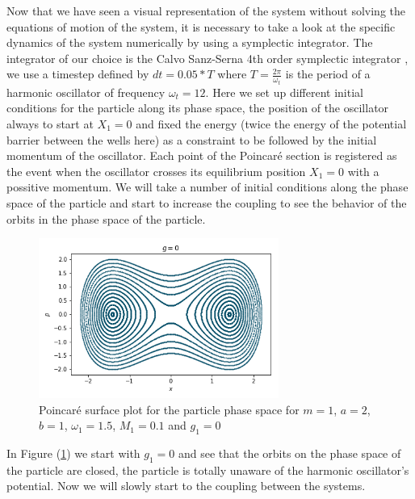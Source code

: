 Now that we have seen a visual representation of the system without solving the equations of motion of the system, it is necessary to take a look at the specific dynamics of the system numerically by using a symplectic integrator. The integrator of our choice is the Calvo Sanz-Serna 4th order symplectic integrator \cite{gray1994symplectic}\cite{sanz1993symplectic}\cite{rackauckas2017differentialequations}, we use a timestep defined by $dt=0.05*T$ where $T=\frac{2\pi}{\omega_t}$ is the period of a harmonic oscillator of frequency $\omega_t=12$. Here we set up different initial conditions for the particle along its phase space, the position of the oscillator always to start at $X_1=0$ and fixed the energy (twice the energy of the potential barrier between the wells here) as a constraint to be followed by the initial momentum of the oscillator. Each point of the Poincaré section is registered as the event when the oscillator crosses its equilibrium position $X_1=0$ with a possitive momentum. We will take a number of initial conditions along the phase space of the particle and start to increase the coupling to see the behavior of the orbits in the phase space of the particle.

\begin{figure}[H]
\centering
\includegraphics[width=0.7\textwidth]{Figures/poincare_g0.png}
\caption{Poincaré surface plot for the particle phase space for $m=1$, $a=2$, $b=1$, $\omega_1=1.5$, $M_1=0.1$ and $g_1=0$\label{fig:poinc_g0}
}
\end{figure}

In Figure (\ref{fig:poinc_g0}) we start with $g_1=0$ and see that the orbits on the phase space of the particle are closed, the particle is totally unaware of the harmonic oscillator's potential. Now we will slowly start to  the coupling between the systems.\par 


